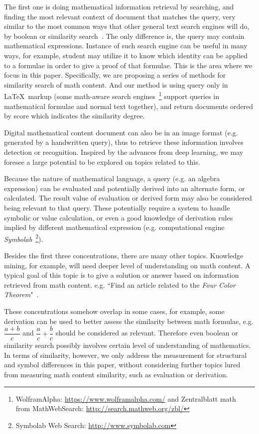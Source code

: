 The first one is doing mathematical information retrieval by searching, and finding the most relevant context of document that matches the query, very similar to the most common ways that other general text search engines will do, by boolean or similarity search~\cite{iir}. 
The only difference is, the query may contain mathematical expressions. 
Instance of such search engine can be useful in many ways, for example, student may utilize it to know which identity can be applied to a formulae in order to give a proof of that formulae.
This is the area where we focus in this paper. Specifically, we are proposing a series of methods for similarity search of math content. And our method is using query only in \LaTeX\ markup 
(some math-aware search engines~\footnote{WolframAlpha: \url{https://www.wolframalpha.com/} and Zentralblatt math \\from MathWebSearch: \url{http://search.mathweb.org/zbl/}} support queries in mathematical formulae and normal text together), and return documents ordered by score which indicates the similarity degree. 

Digital mathematical content document can also be in an image format (e.g. generated by a handwritten query), thus to retrieve these information involves detection or recognition. Inspired by the advances from deep learning, we may foresee a large potential to be explored on topics related to this. 

Because the nature of mathematical language, a query (e.g. an algebra expression) can be evaluated and potentially derived into an alternate form, or calculated. 
The result value of evaluation or derived form may also be considered being relevant to that query. 
These potentially require a system to handle symbolic or value calculation, or even a good knowledge of derivation rules implied by different mathematical expression
(e.g. computational engine \textit{Symbolab}~\footnote{Symbolab Web Search: \url{http://www.symbolab.com}}).

Besides the first three concentrations, there are many other topics. Knowledge mining, for example, will need deeper level of understanding on math content. A typical goal of this topic is to give a solution or answer based on information retrieved from math content. e.g. ``Find an article related to the \textit{Four Color Theorem}"~\cite{ntcirtopic}.

These concentrations somehow overlap in some cases, for example, some derivation can be used to better assess the similarity between math formulae, e.g. $\dfrac{a + b}{c}$ and $\dfrac{a}{c} + \dfrac{b}{c}$ should be considered as relevant.
Therefore even boolean or similarity search possibly involves certain level of understanding of mathematics. In terms of similarity, however, we only address the measurement for structural and symbol differences in this paper, without considering further topics lured from measuring math content similarity, such as evaluation or derivation.

